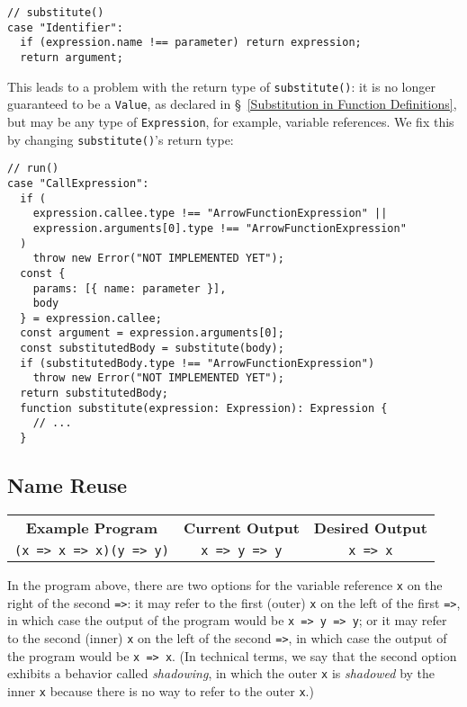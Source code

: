 \documentclass[12pt, oneside]{book}
\begin{document}
\begin{verbatim}
// substitute()
case "Identifier":
  if (expression.name !== parameter) return expression;
  return argument;
\end{verbatim}

This leads to a problem with the return type of \texttt{substitute()}: it is no longer guaranteed to be a \texttt{Value}, as declared in §~\ref{Substitution in Function Definitions}, but may be any type of \texttt{Expression}, for example, variable references. We fix this by changing \texttt{substitute()}’s return type:

\begin{verbatim}
// run()
case "CallExpression":
  if (
    expression.callee.type !== "ArrowFunctionExpression" ||
    expression.arguments[0].type !== "ArrowFunctionExpression"
  )
    throw new Error("NOT IMPLEMENTED YET");
  const {
    params: [{ name: parameter }],
    body
  } = expression.callee;
  const argument = expression.arguments[0];
  const substitutedBody = substitute(body);
  if (substitutedBody.type !== "ArrowFunctionExpression")
    throw new Error("NOT IMPLEMENTED YET");
  return substitutedBody;
  function substitute(expression: Expression): Expression {
    // ...
  }
\end{verbatim}

\subsection{Name Reuse}

\begin{center}
\begin{tabular}{c|c|c}
\textbf{Example Program} & \textbf{Current Output} & \textbf{Desired Output} \\
\texttt{(x => x => x)(y => y)} & \texttt{x => y => y} & \texttt{x => x} \\
\end{tabular}
\end{center}

\noindent In the program above, there are two options for the variable reference \texttt{x} on the right of the second \texttt{=>}: it may refer to the first (outer) \texttt{x} on the left of the first \texttt{=>}, in which case the output of the program would be \texttt{x => y => y}; or it may refer to the second (inner) \texttt{x} on the left of the second \texttt{=>}, in which case the output of the program would be \texttt{x => x}. (In technical terms, we say that the second option exhibits a behavior called \emph{shadowing}, in which the outer \texttt{x} is \emph{shadowed} by the inner \texttt{x} because there is no way to refer to the outer \texttt{x}.)
\end{document}
